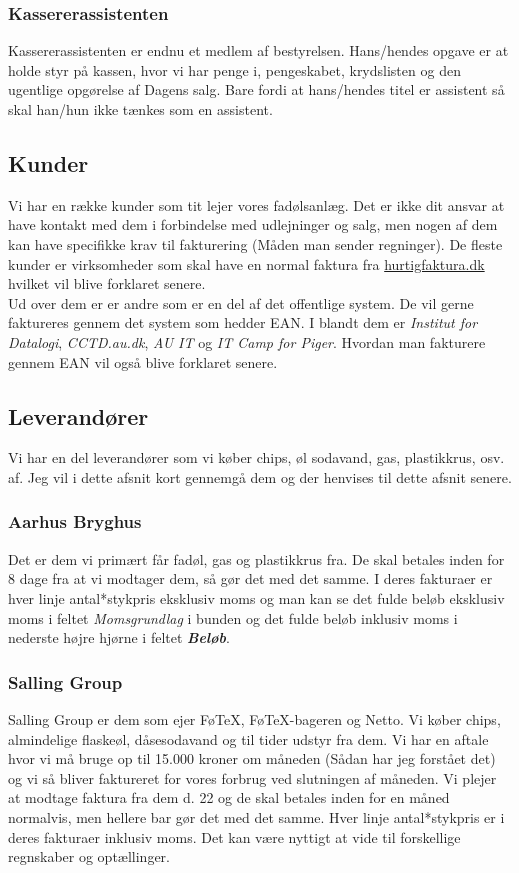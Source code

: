 \subsubsection{Kassererassistenten}
Kassererassistenten er endnu et medlem af bestyrelsen. Hans/hendes opgave er at holde styr på kassen, hvor vi har penge i, pengeskabet, krydslisten og den ugentlige opgørelse af Dagens salg. Bare fordi at hans/hendes titel er assistent så skal han/hun ikke tænkes som en assistent.
\subsection{Kunder}
Vi har en række kunder som tit lejer vores fadølsanlæg. Det er ikke dit ansvar at have kontakt med dem i forbindelse med udlejninger og salg, men nogen af dem kan have specifikke krav til fakturering (Måden man sender regninger). De fleste kunder er virksomheder som skal have en normal faktura fra \href{https://www.hurtigfaktura.dk/}{hurtigfaktura.dk} hvilket vil blive forklaret senere.\\
Ud over dem er er andre som er en del af det offentlige system. De vil gerne faktureres gennem det system som hedder EAN. I blandt dem er \textit{Institut for Datalogi}, \textit{CCTD.au.dk}, \textit{AU IT} og \textit{IT Camp for Piger}. Hvordan man fakturere gennem EAN vil også blive forklaret senere.

\subsection{Leverandører}
Vi har en del leverandører som vi køber chips, øl sodavand, gas, plastikkrus, osv. af. Jeg vil i dette afsnit kort gennemgå dem og der henvises til dette afsnit senere.
\subsubsection{Aarhus Bryghus}
Det er dem vi primært får fadøl, gas og plastikkrus fra. De skal betales inden for 8 dage fra at vi modtager dem, så gør det med det samme. I deres fakturaer er hver linje antal*stykpris eksklusiv moms og man kan se det fulde beløb eksklusiv moms i feltet \textit{Momsgrundlag} i bunden og det fulde beløb inklusiv moms i nederste højre hjørne i feltet \textbf{\textit{Beløb}}.
\subsubsection{Salling Group}
Salling Group er dem som ejer FøTeX, FøTeX-bageren og Netto. Vi køber chips, almindelige flaskeøl, dåsesodavand og til tider udstyr fra dem. Vi har en aftale hvor vi må bruge op til 15.000 kroner om måneden (Sådan har jeg forstået det) og vi så bliver faktureret for vores forbrug ved slutningen af måneden. Vi plejer at modtage faktura fra dem d. 22 og de skal betales inden for en måned normalvis, men hellere bar gør det med det samme. Hver linje antal*stykpris er i deres fakturaer inklusiv moms. Det kan være nyttigt at vide til forskellige regnskaber og optællinger.
